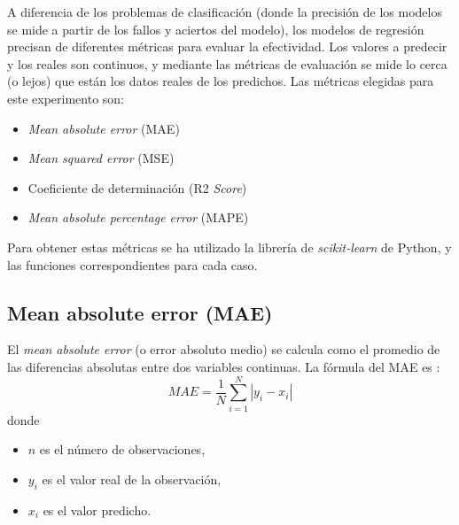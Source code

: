 \documentclass[12pt,a4paper,Spanish]{article}
\begin{document}
A diferencia de los problemas de clasificación (donde la precisión de los modelos se mide a partir de los fallos y aciertos del modelo), los modelos de regresión precisan de diferentes métricas para evaluar la efectividad. Los valores a predecir y los reales son continuos, y mediante las métricas de evaluación se mide lo cerca (o lejos) que están los datos reales de los predichos.
Las métricas elegidas para este experimento son:
\begin{itemize}
	\item \textit{Mean absolute error} (MAE)
	\item \textit{Mean squared error} (MSE)
	\item Coeficiente de determinación (R2 \textit{Score})
	\item \textit{Mean absolute percentage error} (MAPE)
\end{itemize}

Para obtener estas métricas se ha utilizado la librería de \textit{scikit-learn} de Python, y las funciones correspondientes para cada caso.
\subsection{Mean absolute error (MAE)}\label{mae}
El \textit{mean absolute error} (o error absoluto medio) se calcula como el promedio de las diferencias absolutas entre dos variables continuas. La fórmula del MAE es \cite{eswiki:146234007}:
\begin{equation}\label{eq:mae}
	MAE = \frac{1}{N} \sum_{i=1}^{N} |y_i - x_i|
\end{equation}
donde
\begin{itemize}
	\item $n$ es el número de observaciones,
	\item $y_i$ es el valor real de la observación,
	\item $x_i$ es el valor predicho.
\end{itemize}
\end{document}
